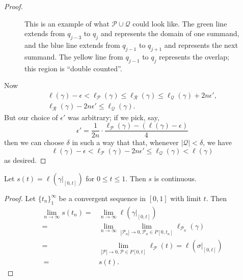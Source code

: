 \documentclass[12pt]{article}
\begin{document}
\begin{proof}
\begin{figure}
		\caption{This is an example of what $\mathcal{P}\cup\mathcal{Q}$ could look like. The green line extends from $q_{j-3}$ to $q_j$ and represents the domain of one summand, and the blue line extends from $q_{j-1}$ to $q_{j+1}$ and represents the next summand. The yellow line from $q_{j-1}$ to $q_j$ represents the overlap; this region is ``double counted''.}
	\end{figure}

	Now 
	\begin{gather*}
		\ell(\gamma)-\epsilon < \ell_\mathcal{P}(\gamma) \leq \ell_\mathcal{R}(\gamma) \leq \ell_\mathcal{Q}(\gamma) + 2n\epsilon', \\
		\ell_\mathcal{R}(\gamma) - 2n\epsilon' \leq \ell_\mathcal{Q}(\gamma).
	\end{gather*}
	But our choice of $\epsilon'$ was arbitrary; if we pick, say,
	\begin{equation*}
		\epsilon' = \frac{1}{2n} \cdot \frac{\ell_\mathcal{P}(\gamma)-(\ell(\gamma)-\epsilon)}{4}
	\end{equation*}
	then we can choose $\delta$ in such a way that that, whenever $|\mathcal{Q}|<\delta$, we have 
	\begin{equation*}
		\ell(\gamma)-\epsilon < \ell_\mathcal{P}(\gamma)-2n\epsilon' \leq \ell_\mathcal{Q}(\gamma) < \ell(\gamma)
	\end{equation*}
	as desired.
\end{proof}

\begin{proposition}
	Let $s(t) = \ell(\gamma|_{[0,t]})$ for $0\leq t\leq 1$. Then $s$ is continuous.
\end{proposition}
\begin{proof}
	Let $\{t_n\}_1^\infty$ be a convergent sequence in $[0,1]$ with limit $t$. Then 
	\begin{align*}
		\lim_{n\to \infty} s(t_n) 
		=& \lim_{n\to\infty} \ell(\gamma|_{[0,t]}) \\
		=& \lim_{n\to\infty} \lim_{|\mathcal{P}_n|\to 0, \mathcal{P}_n\in P[0,t_n]} \ell_{\mathcal{P}_n}(\gamma) \\
		=& \lim_{|\mathcal{P}|\to 0, \mathcal{P}\in P[0,t]} \ell_\mathcal{P}(t) = \ell(\sigma|_{[0,t]}) \\\
		=& s(t).
	\end{align*}
\end{proof}


\end{document}
